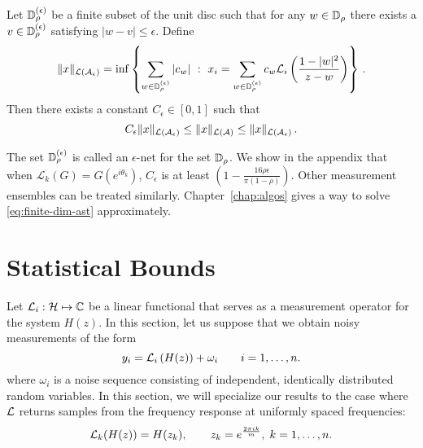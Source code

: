 \begin{prop}\label{prop:grid}
Let $\mathbb{D}_\rho^{(\epsilon)}$ be a finite subset of the unit disc such that for any $w \in \mathbb{D}_\rho$ there exists a $v \in \mathbb{D}_\rho^{(\epsilon)}$ satisfying $|w-v| \leq \epsilon$.  Define
\[
	\|x\|_{\mathcal{L}(\mathcal{A}_\epsilon)} = \inf\left\{ \sum_{w\in \mathbb{D}_{\rho}^{(\epsilon)}} |c_w| ~:~ x_i = \sum_{w\in\mathbb{D}_{\rho}^{(\epsilon)}} c_w\mathcal{L}_i\left(\frac{1-|w|^2}{z-w} \right)\right\}\,.
\]
Then there exists a constant $C_\epsilon \in [0,1]$ such that
\[
	C_\epsilon \|x\|_{\mathcal{L}(\mathcal{A}_{\epsilon})} \leq \|x\|_{\mathcal{L}(\mathcal{A})} \leq \|x\|_{\mathcal{L}(\mathcal{A}_{\epsilon})} \,.
\]
\end{prop}
\noindent The set $\mathbb{D}_\rho^{(\epsilon)}$ is called an $\epsilon$-net for the set
$\mathbb{D}_\rho$. We show in the appendix that when $\mathcal{L}_k(G) =
G(e^{i\theta_k})$, $C_{\epsilon}$ is at least $(1-\tfrac{16 \rho
\epsilon}{\pi(1-\rho)})$. Other measurement ensembles can be treated similarly.
Chapter~\ref{chap:algos} gives a way to solve \eqref{eq:finite-dim-ast}
approximately.

\section{Statistical Bounds}\label{sec:statistics}
Let $\mathcal{L}_i: \mathcal{H} \mapsto \mathbb{C} $ be a linear functional that serves as a measurement
operator for the system $H(z)$. In this section, let us suppose that we obtain
noisy measurements of the form
$$
y_i=\mathcal{L}_i \left( H(z) \right) +\omega_i \qquad i=1, \ldots, n.
$$
where $\omega_i$ is a noise sequence consisting of independent, identically
distributed random variables. In this section, we will specialize our results to
the case where $\mathcal{L}$ returns samples from the frequency response at uniformly
spaced frequencies:
$$
\mathcal{L}_k(H(z))=H(z_k), \qquad z_k=e^{\frac{2 \pi i k}{m} }, \; k=1, \ldots, n.
$$
%
%

